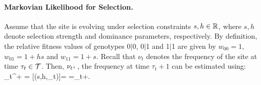 \documentclass[11pt]{article}
\begin{document}
\paragraph{Markovian Likelihood for Selection.}
Assume that the site is evolving under selection constraints $s,h\in
{\mathbb R}$, where $s,h$ denote selection strength and dominance parameters,
respectively. By definition, the relative fitness values of genotypes
0$|$0, 0$|$1 and 1$|$1 are given by $w_{00}=1$, $w_{01}=1+hs$ and
$w_{11}=1+s$. Recall that $\nu_t$ denotes the frequency of the site at
time $\tau_t\in {\cal T}$. Then, $\nu_{t^+}$, the frequency at time
$\tau_t+1$ can be estimated using: 
\beq \hat{\nu}_{t^+} =
[\nusp(s,h,\nu_t)]=
=\nu_t+.
  \label{eq:transition}
\eeq
\end{document}
